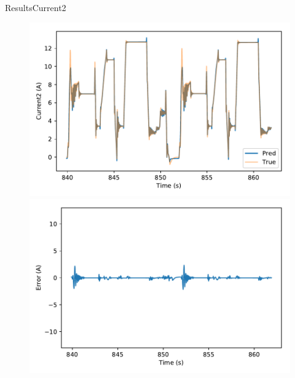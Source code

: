 \documentclass[handout]{beamer}
\begin{document}
\begin{frame}{Results}{Current2}
\begin{center}
  \begin{figure}
  \includegraphics[scale=0.4]{images/current2_pred_vs_time}\\
 \includegraphics[scale=0.4]{images/current2_error_vs_time}
  \end{figure}
\end{center}
\end{frame}
\end{document}
